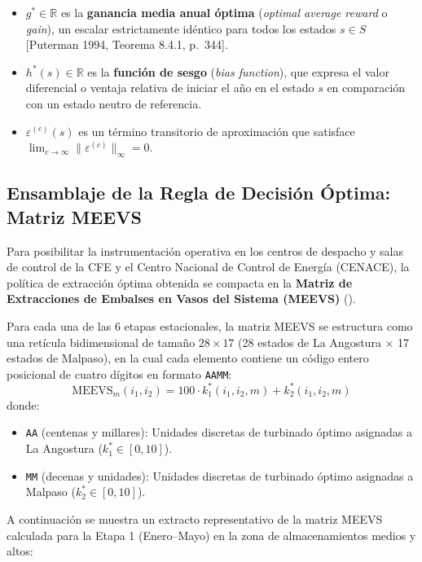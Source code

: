 \documentclass[
  spanish,
  letterpaper,
]{scrreprt}
\providecommand{\tightlist}{%
  \setlength{\itemsep}{0pt}\setlength{\parskip}{0pt}}
\theoremstyle{definition}
\theoremstyle{remark}
\begin{document}
\begin{itemize}
\tightlist
\item
  \(g^* \in \mathbb{R}\) es la \textbf{ganancia media anual óptima}
  (\emph{optimal average reward} o \emph{gain}), un escalar
  estrictamente idéntico para todos los estados \(s \in S\) {[}Puterman
  1994, Teorema 8.4.1, p.~344{]}.
\item
  \(h^*(s) \in \mathbb{R}\) es la \textbf{función de sesgo} (\emph{bias
  function}), que expresa el valor diferencial o ventaja relativa de
  iniciar el año en el estado \(s\) en comparación con un estado neutro
  de referencia.
\item
  \(\varepsilon^{(c)}(s)\) es un término transitorio de aproximación que
  satisface \(\lim_{c \to \infty} \|\varepsilon^{(c)}\|_\infty = 0\).
\end{itemize}

\subsection{Ensamblaje de la Regla de Decisión Óptima: Matriz
MEEVS}\label{ensamblaje-de-la-regla-de-decisiuxf3n-uxf3ptima-matriz-meevs}

Para posibilitar la instrumentación operativa en los centros de despacho
y salas de control de la CFE y el Centro Nacional de Control de Energía
(CENACE), la política de extracción óptima obtenida se compacta en la
\textbf{Matriz de Extracciones de Embalses en Vasos del Sistema (MEEVS)}
().

Para cada una de las 6 etapas estacionales, la matriz MEEVS se
estructura como una retícula bidimensional de tamaño \(28 \times 17\)
(28 estados de La Angostura \(\times\) 17 estados de Malpaso), en la
cual cada elemento contiene un código entero posicional de cuatro
dígitos en formato \texttt{AAMM}:
\[\text{MEEVS}_m(i_1, i_2) = 100 \cdot k_1^*(i_1, i_2, m) + k_2^*(i_1, i_2, m)\]
donde:

\begin{itemize}
\tightlist
\item
  \texttt{AA} (centenas y millares): Unidades discretas de turbinado
  óptimo asignadas a La Angostura (\(k_1^* \in [0, 10]\)).
\item
  \texttt{MM} (decenas y unidades): Unidades discretas de turbinado
  óptimo asignadas a Malpaso (\(k_2^* \in [0, 10]\)).
\end{itemize}

A continuación se muestra un extracto representativo de la matriz MEEVS
calculada para la Etapa 1 (Enero--Mayo) en la zona de almacenamientos
medios y altos:
\end{document}
